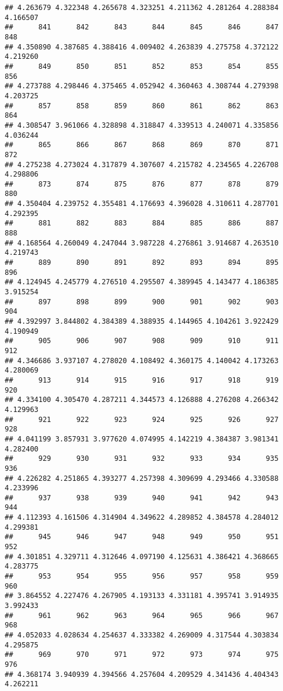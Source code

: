 \documentclass[
]{article}
\begin{document}
\begin{verbatim}
## 4.263679 4.322348 4.265678 4.323251 4.211362 4.281264 4.288384 4.166507 
##      841      842      843      844      845      846      847      848 
## 4.350890 4.387685 4.388416 4.009402 4.263839 4.275758 4.372122 4.219260 
##      849      850      851      852      853      854      855      856 
## 4.273788 4.298446 4.375465 4.052942 4.360463 4.308744 4.279398 4.203725 
##      857      858      859      860      861      862      863      864 
## 4.308547 3.961066 4.328898 4.318847 4.339513 4.240071 4.335856 4.036244 
##      865      866      867      868      869      870      871      872 
## 4.275238 4.273024 4.317879 4.307607 4.215782 4.234565 4.226708 4.298806 
##      873      874      875      876      877      878      879      880 
## 4.350404 4.239752 4.355481 4.176693 4.396028 4.310611 4.287701 4.292395 
##      881      882      883      884      885      886      887      888 
## 4.168564 4.260049 4.247044 3.987228 4.276861 3.914687 4.263510 4.219743 
##      889      890      891      892      893      894      895      896 
## 4.124945 4.245779 4.276510 4.295507 4.389945 4.143477 4.186385 3.915254 
##      897      898      899      900      901      902      903      904 
## 4.392997 3.844802 4.384389 4.388935 4.144965 4.104261 3.922429 4.190949 
##      905      906      907      908      909      910      911      912 
## 4.346686 3.937107 4.278020 4.108492 4.360175 4.140042 4.173263 4.280069 
##      913      914      915      916      917      918      919      920 
## 4.334100 4.305470 4.287211 4.344573 4.126888 4.276208 4.266342 4.129963 
##      921      922      923      924      925      926      927      928 
## 4.041199 3.857931 3.977620 4.074995 4.142219 4.384387 3.981341 4.282400 
##      929      930      931      932      933      934      935      936 
## 4.226282 4.251865 4.393277 4.257398 4.309699 4.293466 4.330588 4.233996 
##      937      938      939      940      941      942      943      944 
## 4.112393 4.161506 4.314904 4.349622 4.289852 4.384578 4.284012 4.299381 
##      945      946      947      948      949      950      951      952 
## 4.301851 4.329711 4.312646 4.097190 4.125631 4.386421 4.368665 4.283775 
##      953      954      955      956      957      958      959      960 
## 3.864552 4.227476 4.267905 4.193133 4.331181 4.395741 3.914935 3.992433 
##      961      962      963      964      965      966      967      968 
## 4.052033 4.028634 4.254637 4.333382 4.269009 4.317544 4.303834 4.295875 
##      969      970      971      972      973      974      975      976 
## 4.368174 3.940939 4.394566 4.257604 4.209529 4.341436 4.404343 4.262211 

\end{verbatim}
\end{document}
